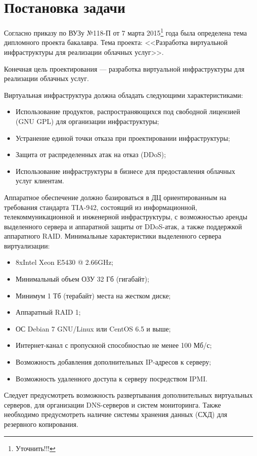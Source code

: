 \section{Постановка задачи}
Согласно приказу по ВУЗу №118-П от 7 марта 2015\footnote{Уточнить!!!} года была определена тема дипломного проекта бакалавра.
Тема проекта: <<Разработка виртуальной инфраструктуры для реализации облачных услуг>>.

Конечная цель проектирования --- разработка виртуальной инфраструктуры для реализации облачных услуг.

Виртуальная инфраструктура должна обладать следующими характеристиками:
\begin{itemize}
    \item Использование продуктов, распространяющихся под свободной лицензией (GNU GPL) для организации инфраструктуры;
    \item Устранение единой точки отказа при проектировании инфраструктуры;
    \item Защита от распределенных атак на отказ (DDoS);
    \item Использование инфраструктуры в бизнесе для предоставления облачных услуг клиентам.
\end{itemize}

Аппаратное обеспечение должно базироваться в ДЦ ориентированным на требования стандарта TIA-942, состоящий из информационной, телекоммуникационной и инженерной инфраструктуры, с возможностью аренды выделенного сервера и аппаратной защиты от DDoS-атак, а также поддержкой аппаратного RAID.
Минимальные характеристики выделенного сервера виртуализации:
\begin{itemize}
    \item 8xIntel Xeon E5430 @ 2.66GHz;
    \item Минимальный объем ОЗУ 32 Гб (гигабайт);
    \item Минимум 1 Тб (терабайт) места на жестком диске;
    \item Аппаратный RAID 1;
    \item ОС Debian 7 GNU/Linux или CentOS 6.5 и выше;
    \item Интернет-канал с пропускной способностью не менее 100 Мб/с;
    \item Возможность добавления дополнительных IP-адресов к серверу;
    \item Возможность удаленного доступа к серверу посредством IPMI.
\end{itemize}

Следует предусмотреть возможность развертывания дополнительных виртуальных серверов, для организации DNS-серверов и систем мониторинга.
Также необходимо предусмотреть наличие системы хранения данных (СХД) для резервного копирования.

